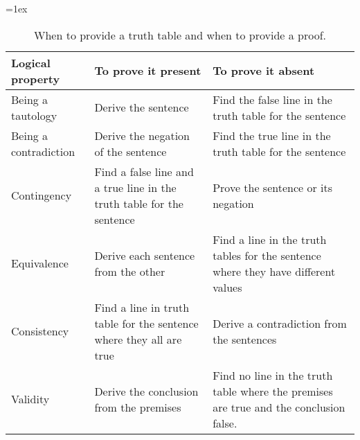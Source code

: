\begin{table}
\tabulinesep=1ex
\begin{mdframed}[style=mytablebox]
\begin{tabu}{X[.7,c,m] ||X[1,l,m] |X[1,l,m]}
\textbf{Logical property} 	&	\textbf{To prove it present} 	&	\textbf{To prove it absent} \\ \hline \hline
Being a tautology 		& Derive the sentence  						& Find the false line in the truth table for the sentence \\ \hline
Being a contradiction 	&  Derive the negation of the sentence  		 & Find the true line in the truth table for the sentence\\ \hline
Contingency 			& Find a false line and a true line in the truth table for the sentence & Prove the sentence or its negation\\ \hline
Equivalence 			& Derive each sentence from the other 		 & Find a line in the truth tables for the sentence where they have different values\\ \hline
Consistency 		& Find a line in truth table for the sentence where they all are true & Derive a contradiction from the sentences\\ \hline
Validity 				& Derive the conclusion from the premises & Find no line in the truth table where the premises are true and the conclusion false. \\ 
\end{tabu}
\end{mdframed}
\caption{When to provide a truth table and when to provide a proof.}
\label{table.ProofOrModel}
\end{table}



